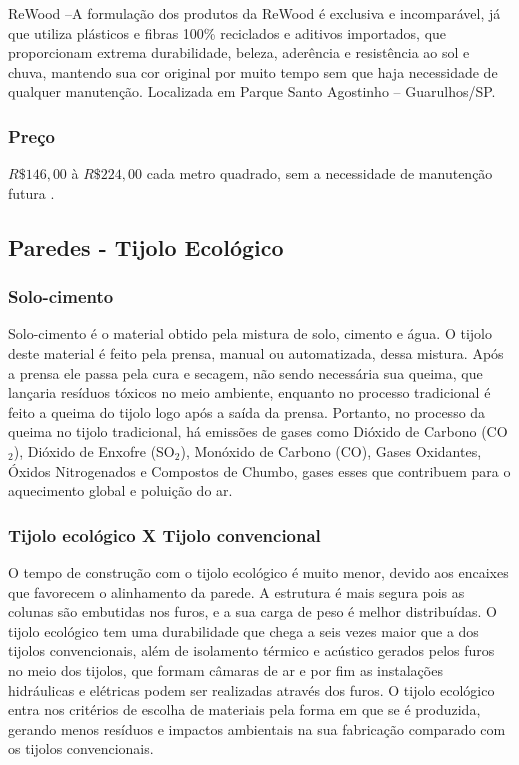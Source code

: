 ReWood –A formulação dos produtos da ReWood é exclusiva e incomparável, já que utiliza plásticos e fibras 100\% reciclados e aditivos importados, que proporcionam extrema durabilidade, beleza, aderência e resistência ao sol e chuva, mantendo sua cor original por muito tempo sem que haja necessidade de qualquer manutenção. Localizada em Parque Santo Agostinho – Guarulhos/SP.

\subsubsection*{\textbf{Preço}}

	$R\$146,00$ à $R\$ 224,00$ cada metro quadrado, sem a necessidade de manutenção futura \cite{BlogReWood}.


\subsection{Paredes - Tijolo Ecológico }

\subsubsection*{\textbf{Solo-cimento}}
	
	Solo-cimento é o material obtido pela mistura de solo, cimento e água. O tijolo deste material é feito pela prensa, manual ou automatizada, dessa mistura. Após a prensa ele passa pela cura e secagem, não sendo necessária sua queima, que lançaria resíduos tóxicos no meio ambiente, enquanto no processo tradicional é feito a queima do tijolo logo após a saída da prensa. Portanto, no processo da queima no tijolo tradicional, há emissões de gases como Dióxido de Carbono (CO$_2$), Dióxido de Enxofre (SO$_2$), Monóxido de Carbono (CO), Gases Oxidantes, Óxidos Nitrogenados e Compostos de Chumbo, gases esses que contribuem para o aquecimento global e poluição do ar\cite{1980Portland}.\\

\subsubsection*{\textbf{Tijolo ecológico X Tijolo convencional}}
	O tempo de construção com o tijolo ecológico é muito menor, devido aos encaixes que favorecem o alinhamento da parede. A estrutura é mais segura pois as colunas são embutidas nos furos, e a sua carga de peso é melhor distribuídas. O tijolo ecológico tem uma durabilidade que chega a seis vezes maior que a dos tijolos convencionais, além de isolamento térmico e acústico gerados pelos furos no meio dos tijolos, que formam câmaras de ar e por fim as instalações hidráulicas e elétricas podem ser realizadas através dos furos. O tijolo ecológico entra nos critérios de escolha de materiais pela forma em que se é produzida, gerando menos resíduos e impactos ambientais na sua fabricação comparado com os tijolos convencionais.





